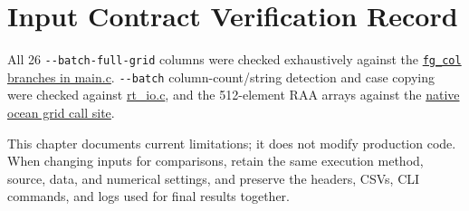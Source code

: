\section{Input Contract Verification Record}
\label{sec:auto:08_input_formats:6}
All 26 \texttt{-\allowbreak{}-\allowbreak{}batch-\allowbreak{}full-\allowbreak{}grid} columns were checked exhaustively against the \href{https://github.com/brtnt/OCRT/blob/54861c68e35ec5aaa3938fad53e93dc2dfa7eb1d/code/OCRT_C/src/main.c\#L685}{\texttt{fg\_\allowbreak{}col} branches in main.c}. \texttt{-\allowbreak{}-\allowbreak{}batch} column-count/string detection and case copying were checked against \href{https://github.com/brtnt/OCRT/blob/54861c68e35ec5aaa3938fad53e93dc2dfa7eb1d/code/OCRT_C/src/rt_io.c\#L60}{rt\_io.c}, and the 512-element RAA arrays against the \href{https://github.com/brtnt/OCRT/blob/54861c68e35ec5aaa3938fad53e93dc2dfa7eb1d/code/OCRT_C/src/main.c\#L1222}{native ocean grid call site}.

This chapter documents current limitations; it does not modify production code. When changing inputs for comparisons, retain the same execution method, source, data, and numerical settings, and preserve the headers, CSVs, CLI commands, and logs used for final results together.

